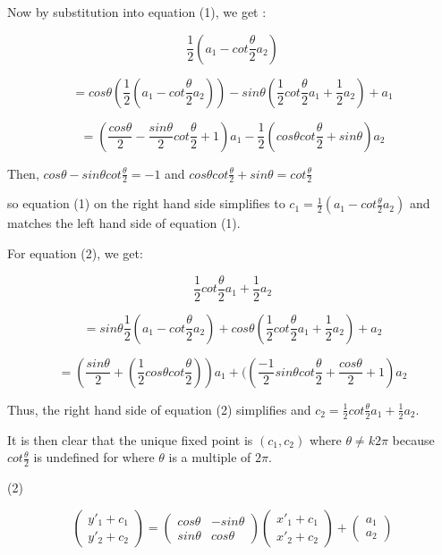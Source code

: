 \documentclass[12pt]{article}
\begin{document}
Now by substitution into equation (1), we get :

$$\frac{1}{2} (a_1 - cot \frac{\theta}{2}a_2)$$

$$=cos\theta(\frac{1}{2} (a_1 - cot \frac{\theta}{2}a_2)) - sin\theta(\frac{1}{2}cot\frac {\theta}{2}a_1 + \frac{1}{2}a_2) + a_1$$

$$=(\frac{cos\theta}{2} - \frac{sin\theta}{2}cot\frac{\theta}{2} +1)a_1 - \frac{1}{2}(cos\theta cot\frac{\theta}{2} + sin\theta)a_2$$


Then, $cos\theta - sin\theta cot \frac{\theta}{2} = -1$ and $cos\theta cot \frac{\theta}{2} + sin\theta = cot \frac{\theta}{2}$

so equation (1) on the right hand side simplifies to  $c_1 = \frac{1}{2} (a_1 - cot \frac{\theta}{2}a_2)$ and matches the left hand side of equation (1).

For equation (2), we get:

$$\frac{1}{2}cot\frac {\theta}{2}a_1 + \frac{1}{2}a_2$$

$$=sin\theta\frac{1}{2} (a_1 - cot \frac{\theta}{2}a_2)+ cos\theta(\frac{1}{2}cot\frac {\theta}{2}a_1 + \frac{1}{2}a_2) + a_2$$

$$=(\frac{sin\theta}{2} + (\frac{1}{2} cos\theta cot\frac{\theta}{2}))a_1 +((\frac{-1}{2}sin\theta cot\frac{\theta}{2} + \frac{cos\theta}{2} +1)a_2$$

Thus, the right hand side of equation (2) simplifies and $c_2= \frac{1}{2}cot\frac {\theta}{2}a_1 + \frac{1}{2}a_2$.



It is then clear that the unique fixed point is $(c_1,c_2)$ where $\theta\ne k2\pi$ because $cot\frac{\theta}{2}$ is undefined for where $\theta$ is a multiple of $2\pi$.


\medskip
\vspace{0.25 cm}
(2) 

\[\begin{pmatrix} y'_1 + c_1\\y'_2 + c_2 \end{pmatrix} = \begin{pmatrix} cos\theta & -sin\theta \\ 
sin\theta & cos\theta \end{pmatrix} \begin{pmatrix} x'_1 + c_1\\x'_2 + c_2 \end{pmatrix} + \begin{pmatrix} a_1 \\ a_2 \end{pmatrix}\]
\end{document}
